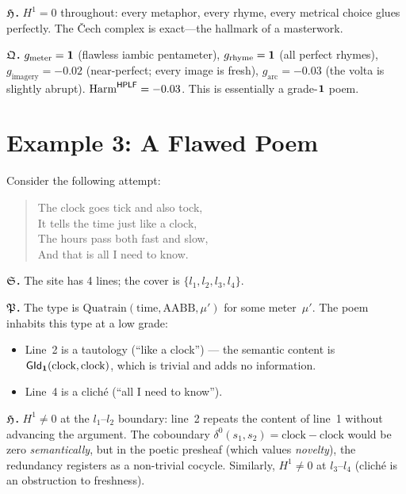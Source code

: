 \textbf{$\mathfrak{H}$.}\quad
$H^1=0$ throughout: every metaphor, every rhyme, every metrical
choice glues perfectly.  The \v{C}ech complex is exact---the
hallmark of a masterwork.

\textbf{$\mathfrak{Q}$.}\quad
$g_{\mathrm{meter}}=\mathbf{1}$ (flawless iambic pentameter),
$g_{\mathrm{rhyme}}=\mathbf{1}$ (all perfect rhymes),
$g_{\mathrm{imagery}}=-0.02$ (near-perfect; every image is
fresh),
$g_{\mathrm{arc}}=-0.03$ (the volta is slightly abrupt).
$\mathrm{Harm}^{\mathsf{HPLF}}=-0.03$.  This is essentially a
grade-$\mathbf{1}$ poem.

\medskip

\section{Example 3: A Flawed Poem}
\label{sec:bad-poem}

Consider the following attempt:
\begin{verse}
  The clock goes tick and also tock,\\
  It tells the time just like a clock,\\
  The hours pass both fast and slow,\\
  And that is all I need to know.
\end{verse}

\textbf{$\mathfrak{S}$.}\quad
The site has 4 lines; the cover is $\{l_1,l_2,l_3,l_4\}$.

\textbf{$\mathfrak{P}$.}\quad
The type is $\mathrm{Quatrain}(\text{time},\text{AABB},\mu')$
for some meter~$\mu'$.  The poem inhabits this type at a low
grade:
\begin{itemize}[nosep]
  \item Line~2 is a tautology (``like a clock'') --- the semantic
    content is $\mathsf{GId}_{\mathbf{1}}(\text{clock},\text{clock})$, which
    is trivial and adds no information.
  \item Line~4 is a clich\'e (``all I need to know'').
\end{itemize}

\textbf{$\mathfrak{H}$.}\quad
$H^1\neq 0$ at the $l_1$--$l_2$ boundary: line~2 repeats
the content of line~1 without advancing the argument.  The
coboundary
$\delta^0(s_1,s_2) = \text{clock}-\text{clock}$ would be zero
\emph{semantically}, but in the poetic presheaf (which values
\emph{novelty}), the redundancy registers as a non-trivial
cocycle.  Similarly, $H^1\neq 0$ at $l_3$--$l_4$ (clich\'e is
an obstruction to freshness).

